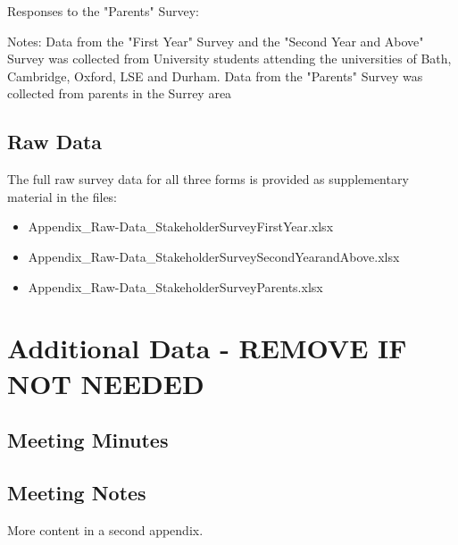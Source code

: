 \documentclass[manuscript]{acmart}
\begin{document}
Responses to the "Parents" Survey:

Notes:
Data from the "First Year" Survey and the "Second Year and Above" Survey was collected from University students attending the universities of Bath, Cambridge, Oxford, LSE and Durham.
Data from the "Parents" Survey was collected from parents in the Surrey area
\subsection{Raw Data}
The full raw survey data for all three forms is provided as supplementary material in the files:
\begin{itemize}
  \item Appendix\_Raw-Data\_StakeholderSurveyFirstYear.xlsx
  \item Appendix\_Raw-Data\_StakeholderSurveySecondYearandAbove.xlsx
  \item Appendix\_Raw-Data\_StakeholderSurveyParents.xlsx
\end{itemize}

\newpage
\section{Additional Data - REMOVE IF NOT NEEDED}
\subsection{Meeting Minutes}
\subsection{Meeting Notes}
More content in a second appendix.
\end{document}
